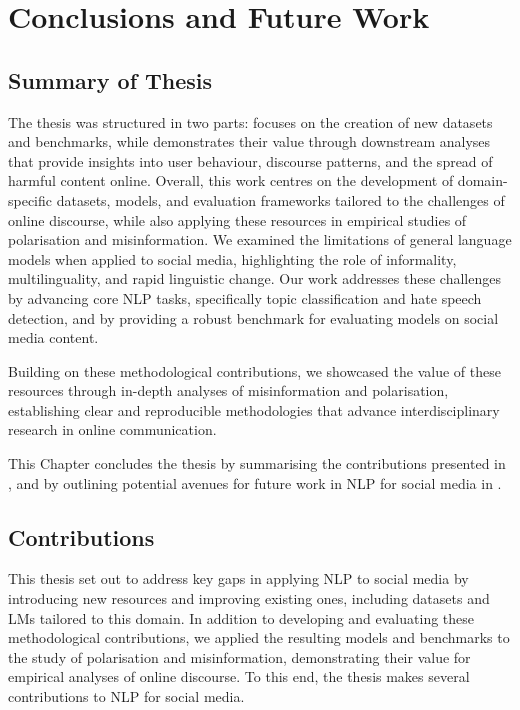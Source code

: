 \chapter{Conclusions and Future Work} 
\label{ch:conclusion} 
\section{Summary of Thesis} \label{ch7:summary}
The thesis was structured in two parts:  focuses on the creation of new datasets and benchmarks, while  demonstrates their value through downstream analyses that provide insights into user behaviour, discourse patterns, and the spread of harmful content online. Overall, this work centres on the development of domain-specific datasets, models, and evaluation frameworks tailored to the challenges of online discourse, while also applying these resources in empirical studies of polarisation and misinformation. We examined the limitations of general language models when applied to social media, highlighting the role of informality, multilinguality, and rapid linguistic change. Our work addresses these challenges by advancing core \ac{NLP} tasks, specifically topic classification and hate speech detection, and by providing a robust benchmark for evaluating models on social media content.

Building on these methodological contributions, we showcased the value of these resources through in-depth analyses of misinformation and polarisation, establishing clear and reproducible methodologies that advance interdisciplinary research in online communication.

This Chapter concludes the thesis by summarising the contributions presented in , and by outlining potential avenues for future work in \ac{NLP} for social media in .


\section{Contributions}
\label{ch7:contributions}
This thesis set out to address key gaps in applying \ac{NLP} to social media by introducing new resources and improving existing ones, including datasets and \acp{LM} tailored to this domain. In addition to developing and evaluating these methodological contributions, we applied the resulting models and benchmarks to the study of polarisation and misinformation, demonstrating their value for empirical analyses of online discourse. To this end, the thesis makes several contributions to \ac{NLP} for social media.


